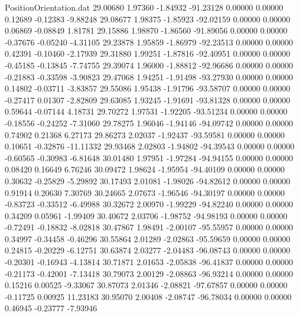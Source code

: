 \begin{filecontents}{PositionOrientation.dat}
  29.00680    1.97360   -1.84932   -91.23128    0.00000    0.00000    0.12689   -0.12383   -9.88248
  29.08677    1.98375   -1.85923   -92.02159    0.00000    0.00000    0.06869   -0.08849    1.81781
  29.15886    1.98870   -1.86560   -91.89056    0.00000    0.00000   -0.37676   -0.05240   -4.31105
  29.23878    1.95859   -1.86979   -92.23513    0.00000    0.00000    0.42391   -0.10460   -2.17939
  29.31880    1.99251   -1.87816   -92.40951    0.00000    0.00000   -0.45185   -0.13845   -7.74755
  29.39074    1.96000   -1.88812   -92.96686    0.00000    0.00000   -0.21883   -0.33598   -3.90823
  29.47068    1.94251   -1.91498   -93.27930    0.00000    0.00000    0.14802   -0.03711   -3.83857
  29.55086    1.95438   -1.91796   -93.58707    0.00000    0.00000   -0.27417    0.01307   -2.82809
  29.63085    1.93245   -1.91691   -93.81328    0.00000    0.00000    0.59644   -0.07144    4.18731
  29.70272    1.97531   -1.92205   -93.51234    0.00000    0.00000   -0.18556   -0.24252   -7.31060
  29.78275    1.96046   -1.94146   -94.09742    0.00000    0.00000    0.74902    0.21368    6.27173
  29.86273    2.02037   -1.92437   -93.59581    0.00000    0.00000    0.10651   -0.32876  -11.11332
  29.93468    2.02803   -1.94802   -94.39543    0.00000    0.00000   -0.60565   -0.30983   -6.81648
  30.01480    1.97951   -1.97284   -94.94155    0.00000    0.00000    0.08420    0.16649    6.76246
  30.09472    1.98624   -1.95954   -94.40109    0.00000    0.00000    0.30632   -0.25829   -5.29892
  30.17493    2.01081   -1.98026   -94.82612    0.00000    0.00000    0.91914    0.20630    7.30769
  30.24665    2.07673   -1.96546   -94.30197    0.00000    0.00000   -0.83723   -0.33512   -6.49988
  30.32672    2.00970   -1.99229   -94.82240    0.00000    0.00000    0.34209    0.05961   -1.99409
  30.40672    2.03706   -1.98752   -94.98193    0.00000    0.00000   -0.72491   -0.18832   -8.02818
  30.47867    1.98491   -2.00107   -95.55957    0.00000    0.00000    0.34997   -0.34458   -0.46296
  30.55864    2.01289   -2.02863   -95.59659    0.00000    0.00000    0.24815   -0.20229   -6.12751
  30.63874    2.03277   -2.04483   -96.08743    0.00000    0.00000   -0.20301   -0.16943   -4.13814
  30.71871    2.01653   -2.05838   -96.41837    0.00000    0.00000   -0.21173   -0.42001   -7.13418
  30.79073    2.00129   -2.08863   -96.93214    0.00000    0.00000    0.15216    0.00525   -9.33067
  30.87073    2.01346   -2.08821   -97.67857    0.00000    0.00000   -0.11725    0.00925   11.23183
  30.95070    2.00408   -2.08747   -96.78034    0.00000    0.00000    0.46945   -0.23777   -7.93946

\end{filecontents}
